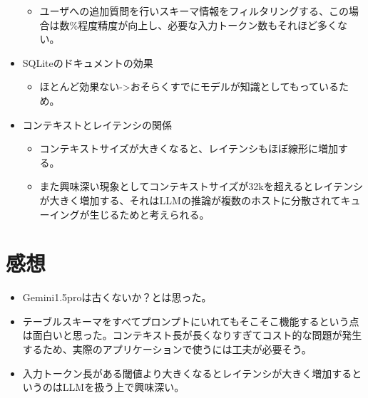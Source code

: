 \documentclass[dvipdfmx,uplatex]{jsarticle}
\theoremstyle{remark}
\newenvironment{experiment}[1]{
    \begin{tcolorbox}[
        colframe=violet,
        colback=violet!10!white,
        colbacktitle=violet!40!white,
        coltitle=black,
        fonttitle=\bfseries,
        title={#1}
    ]
}{
    \end{tcolorbox}
}
\newenvironment{kansou}{
    \begin{tcolorbox}[
        colframe=brown,
        colback=brown!10!white,
        colbacktitle=brown!40!white,
        coltitle=black,fonttitle=\bfseries
    ]
}{
    \end{tcolorbox}
}
\begin{document}
\begin{experiment}{実験結果}
\begin{itemize}
\begin{itemize}
        \item ユーザへの追加質問を行いスキーマ情報をフィルタリングする、この場合は数\%程度精度が向上し、必要な入力トークン数もそれほど多くない。
    \end{itemize}
    \item SQLiteのドキュメントの効果
    \begin{itemize}
        \item ほとんど効果ない->おそらくすでにモデルが知識としてもっているため。
    \end{itemize}
    \item コンテキストとレイテンシの関係
    \begin{itemize}
        \item コンテキストサイズが大きくなると、レイテンシもほぼ線形に増加する。
        \item また興味深い現象としてコンテキストサイズが32kを超えるとレイテンシが大きく増加する、それはLLMの推論が複数のホストに分散されてキューイングが生じるためと考えられる。
    \end{itemize}
\end{itemize}
\end{experiment}

\section{感想}
\begin{kansou}
\begin{itemize}
  \item Gemini1.5proは古くないか？とは思った。
  \item テーブルスキーマをすべてプロンプトにいれてもそこそこ機能するという点は面白いと思った。コンテキスト長が長くなりすぎてコスト的な問題が発生するため、実際のアプリケーションで使うには工夫が必要そう。
  \item 入力トークン長がある閾値より大きくなるとレイテンシが大きく増加するというのはLLMを扱う上で興味深い。
\end{itemize}
\end{kansou}

\end{document}
